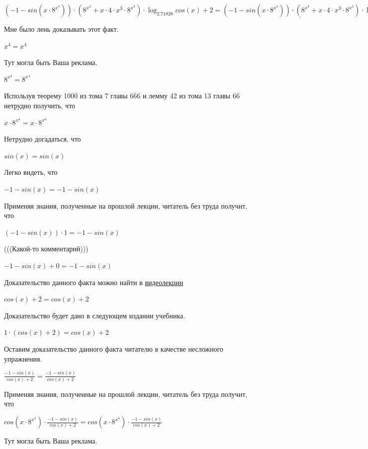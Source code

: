 \documentclass[12pt,a4paper,fleqn]{article}
\theoremstyle{definition}
\begin{document}
$( -1  - sin( x  \cdot { 8 }^{{ x }^{ 4 }})) \cdot ({ 8 }^{{ x }^{ 4 }} +  x  \cdot  4  \cdot { x }^{ 3 } \cdot { 8 }^{{ x }^{ 4 }}) \cdot \log_{ 2.71828 }{cos( x ) +  2 } = ( -1  - sin( x  \cdot { 8 }^{{ x }^{ 4 }})) \cdot ({ 8 }^{{ x }^{ 4 }} +  x  \cdot  4  \cdot { x }^{ 3 } \cdot { 8 }^{{ x }^{ 4 }}) \cdot \log_{ 2.71828 }{cos( x ) +  2 }$

Мне было лень доказывать этот факт.

${ x }^{ 4 } = { x }^{ 4 }$

Тут могла быть Ваша реклама. 

${ 8 }^{{ x }^{ 4 }} = { 8 }^{{ x }^{ 4 }}$

Используя теорему 1000 из тома 7 главы 666 и лемму 42 из тома 13 главы 66 нетрудно получить, что 

$ x  \cdot { 8 }^{{ x }^{ 4 }} =  x  \cdot { 8 }^{{ x }^{ 4 }}$

Нетрудно догадаться, что 

$sin( x ) = sin( x )$

Легко видеть, что 

$ -1  - sin( x ) =  -1  - sin( x )$

Применяя знания, полученные на прошлой лекции, читатель без труда получит, что 

$( -1  - sin( x )) \cdot  1  =  -1  - sin( x )$

(((Какой-то комментарий))) 

$ -1  - sin( x ) +  0  =  -1  - sin( x )$

Доказательство данного факта можно найти в \href{https://www.youtube.com/watch?v=dQw4w9WgXcQ}{видеолекции} 

$cos( x ) +  2  = cos( x ) +  2 $

Доказательство будет дано в следующем издании учебника. 

$ 1  \cdot (cos( x ) +  2 ) = cos( x ) +  2 $

Оставим доказательство данного факта читателю в качестве несложного упражнения. 

$\frac{ -1  - sin( x )}{cos( x ) +  2 }
 = \frac{ -1  - sin( x )}{cos( x ) +  2 }
$

Применяя знания, полученные на прошлой лекции, читатель без труда получит, что 

$cos( x  \cdot { 8 }^{{ x }^{ 4 }}) \cdot \frac{ -1  - sin( x )}{cos( x ) +  2 }
 = cos( x  \cdot { 8 }^{{ x }^{ 4 }}) \cdot \frac{ -1  - sin( x )}{cos( x ) +  2 }
$

Тут могла быть Ваша реклама. 
\end{document}
